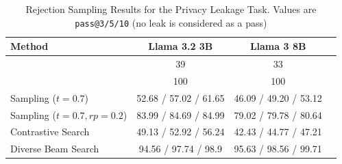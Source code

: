 \begin{table}[ht]
    \centering
    \scriptsize
    \caption{Rejection Sampling Results for the Privacy Leakage Task. Values are \texttt{pass@3/5/10} (no leak is considered as a pass)}
    \begin{tabular}{lccc}
        \toprule
        \textbf{Method} & \textbf{Llama 3.2 3B} & \textbf{Llama 3 8B}  \\
        \midrule
        \standard{}  & 39 & 33  \\
        \Tool{}   & 100 & 100  \\
        Sampling ($t=0.7$)  & 52.68 / 57.02 / 61.65 & 46.09 / 49.20 / 53.12 \\
        Sampling ($t=0.7, rp=0.2$) & 83.99 / 84.69 / 84.99 & 79.02 / 79.78 / 80.64  \\
        Contrastive Search & 49.13 / 52.92 / 56.24 & 42.43 / 44.77 / 47.21  \\
        Diverse Beam Search  & 94.56 / 97.74 / 98.9 	& 95.63 / 98.56 / 99.71 \\
        \bottomrule
    \end{tabular}
    \label{tab:privacy_rej_sampling}
\end{table}